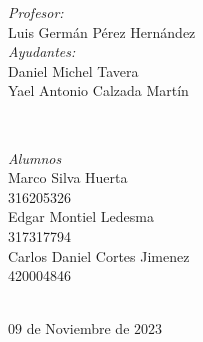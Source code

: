 \begin{titlepage}
    \vspace{10mm}
    \begin{minipage}{0.7\textwidth}
        \begin{flushleft} \large
            \emph{Profesor:}\\
                Luis Germán Pérez Hernández\\
                \vspace{3mm}
                \emph{Ayudantes:}\\
                Daniel Michel Tavera\\
                Yael Antonio Calzada Martín\\
        \end{flushleft}
    \end{minipage}
    \\
    \vspace{10mm}
    \begin{minipage}{0.4\textwidth}
        \begin{flushright} \large
        \centering
            \emph{Alumnos} \\ %
            \vspace{3mm}
            Marco Silva Huerta\\
            316205326\\
            \vspace{4mm}
            Edgar Montiel Ledesma\\
            317317794\\
            \vspace{4mm}
            Carlos Daniel Cortes Jimenez\\
            420004846
        \end{flushright}
    \end{minipage}\\[1.2cm]
    \makeatother
    {\large $09$ de Noviembre de $2023$}\\[2cm]
    \vfill 
    \end{titlepage}